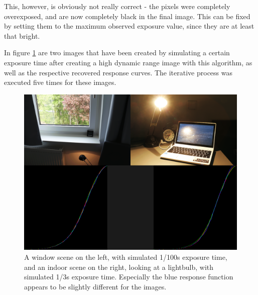 This, however, is obviously not really correct - the pixels were completely
overexposed, and are now completely black in the final image. This can be fixed
by setting them to the maximum observed exposure value, since they are at least
that bright.

In figure \ref{fig:hdr} are two images that have been created by simulating a
certain exposure time after creating a high dynamic range image with this
algorithm, as well as the respective recovered response curves. The iterative
process was executed five times for these images.

\begin{figure}[ht]
  \centering
  \includegraphics[width=\textwidth]{hdr.png}
  \caption{A window scene on the left, with simulated 1/100s exposure time, and
  an indoor scene on the right, looking at a lightbulb, with simulated 1/3s
  exposure time. Especially the blue response function appears to be slightly
  different for the images.}
  \label{fig:hdr}
\end{figure}
